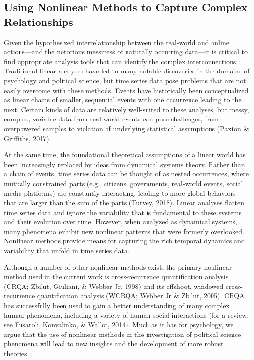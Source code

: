 \documentclass[
  english,
  man]{apa6}
\begin{document}
\hypertarget{using-nonlinear-methods-to-capture-complex-relationships}{%
\subsection{Using Nonlinear Methods to Capture Complex Relationships}\label{using-nonlinear-methods-to-capture-complex-relationships}}

Given the hypothesized interrelationship between the real-world and online
actions---and the notorious messiness of naturally occurring data---it is
critical to find appropriate analysis tools that can identify the complex
interconnections. Traditional linear analyses have led to many notable
discoveries in the domains of psychology and political science, but time series
data pose problems that are not easily overcome with these methods. Events have
historically been conceptualized as linear chains of smaller, sequential events
with one occurrence leading to the next. Certain kinds of data are relatively
well-suited to these analyses, but messy, complex, variable data from real-world
events can pose challenges, from overpowered samples to violation of underlying
statistical assumptions (Paxton \& Griffiths, 2017).

At the same time, the foundational theoretical assumptions of a linear world has
been increasingly replaced by ideas from dynamical systems theory. Rather than a
chain of events, time series data can be thought of as nested occurrences, where
mutually constrained parts (e.g., citizens, governments, real-world events,
social media platforms) are constantly interacting, leading to more global
behaviors that are larger than the sum of the parts (Turvey, 2018).
Linear analyses flatten time series data and ignore the variability that is
fundamental to these systems and their evolution over time. However, when
analyzed as dynamical systems, many phenomena exhibit new nonlinear patterns
that were formerly overlooked. Nonlinear methods provide means for capturing the
rich temporal dynamics and variability that unfold in time series data.

Although a number of other nonlinear methods exist, the primary nonlinear method
used in the current work is cross-recurrence quantification analysis (CRQA; Zbilut, Giuliani, \& Webber Jr, 1998) and its offshoot, windowed cross-recurrence quantification
analysis (WCRQA; Webber Jr \& Zbilut, 2005). CRQA has successfully been used to gain
a better understanding of many complex human phenomena, including a variety of
human social interactions (for a review, see Fusaroli, Konvalinka, \& Wallot, 2014). Much as it
has for psychology, we argue that the use of nonlinear methods in the
investigation of political science phenomena will lead to new insights and the
development of more robust theories.
\end{document}
